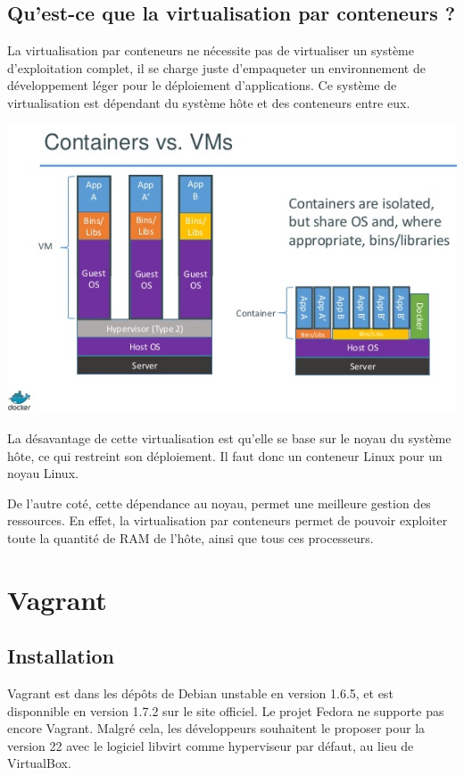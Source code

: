 \documentclass[12pt,a4paper]{article}
\begin{document}
\subsection{Qu'est-ce que la virtualisation par conteneurs ?}

La virtualisation par conteneurs ne nécessite pas de virtualiser un système d'exploitation complet, il se charge juste d'empaqueter un environnement de développement léger pour le déploiement d'applications. Ce système de virtualisation est dépendant du système hôte et des conteneurs entre eux. 

\begin{center}
  \includegraphics[width=15cm]{images_rapport/vm_container.jpg}
\end{center}

La désavantage de cette virtualisation est qu'elle se base sur le noyau du système hôte, ce qui restreint son déploiement. Il faut donc un conteneur Linux pour un noyau Linux. 

De l'autre coté, cette dépendance au noyau, permet une meilleure gestion des ressources. En effet, la virtualisation par conteneurs permet de pouvoir exploiter toute la quantité de RAM de l'hôte, ainsi que tous ces processeurs.

\section{Vagrant}

\subsection{Installation}
Vagrant est dans les dépôts de Debian unstable en version 1.6.5, et est disponnible en version 1.7.2 sur le site officiel. Le projet Fedora ne supporte pas encore Vagrant. Malgré cela, les développeurs souhaitent le proposer pour la version 22 avec le logiciel libvirt comme hyperviseur par défaut, au lieu de VirtualBox.
\end{document}
